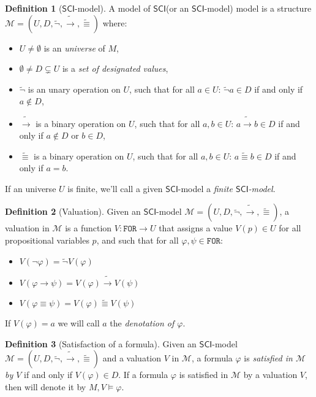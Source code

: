 \documentclass{article}
\theoremstyle{definition}
\newtheorem{definition}{Definition}[section]
\theoremstyle{definition}
\theoremstyle{definition}
\newcommand*{\id}{\equiv}
\newcommand*{\ra}{\rightarrow}
\newcommand*{\FOR}{\texttt{FOR}}
\newcommand{\SCI}{$\mathsf{SCI}$\xspace}
\begin{document}
\begin{definition}[\SCI-model]
    A model of \SCI (or an \SCI-model) model is a structure $\mathcal{M} = (U, D, \tilde{\lnot}, \tilde{\ra}, \tilde{\id})$ where:
    \begin{itemize}
        \item $U \not = \emptyset$ is an \emph{universe} of $M$,
        \item $\emptyset \not = D \subsetneq U$ is a \emph{set of designated values},
        \item $\tilde{\lnot}$ is an unary operation on $U$, such that for all $a \in U$: $\tilde{\lnot}a \in D$ if and only if $a \not \in D$,
        \item $\tilde{\ra}$ is a binary operation on $U$, such that for all $a, b \in U$: $a \tilde{\ra} b \in D$ if and only if $a \not \in D$ or $b \in D$,
        \item $\tilde{\id}$ is a binary operation on $U$, such that for all $a, b \in U$: $a \tilde{\id} b \in D$ if and only if $a = b$.
    \end{itemize}
    \label{model}
\end{definition}
%
If an universe $U$ is finite, we'll call a given \SCI-model a \emph{finite
    \SCI-model}.

\begin{definition}[Valuation]
    Given an \SCI-model $\mathcal{M} = (U, D, \tilde{\lnot}, \tilde{\ra}, \tilde{\id})$, a valuation in $\mathcal{M}$ is a function $V : \FOR \longrightarrow U$ that assigns a value $V(p) \in U$ for all propositional variables $p$, and such that for all $\varphi, \psi \in \FOR$:
    \begin{itemize}
        \item $V(\lnot \varphi) = \tilde{\lnot}V(\varphi)$
        \item $V(\varphi \ra \psi) = V(\varphi) \tilde{\ra} V(\psi)$
        \item $V(\varphi \id \psi) = V(\varphi) \tilde{\id} V(\psi)$
    \end{itemize}
    If $V(\varphi) = a$ we will call $a$ the \emph{denotation of $\varphi$}.
    \label{valuation}
\end{definition}

\begin{definition}[Satisfaction of a formula]
    Given an \SCI-model $\mathcal{M} = (U, D, \tilde{\lnot}, \tilde{\ra}, \tilde{\id})$ and a valuation $V$ in $\mathcal{M}$, a formula $\varphi$ is \emph{satisfied in $\mathcal{M}$ by $V$} if and only if $V(\varphi) \in D$. If a formula $\varphi$ is satisfied in $\mathcal{M}$ by a valuation $V$, then will denote it by $M, V \models \varphi$.
\end{definition}
\end{document}
